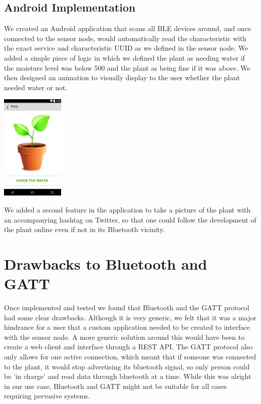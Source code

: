 \documentclass[10pt]{sensys-proc}
\begin{document}
\subsection{Android Implementation} 
We created an Android application that scans all BLE devices around, and once connected to the sensor node, would automatically read the characteristic with the exact service and characteristic UUID as we defined in the sensor node. We added a simple piece of logic in which we defined the plant as needing water if the moisture level was below 500 and the plant as being fine if it was above. We then designed an animation to visually display to the user whether the plant needed water or not. 

\includegraphics[height=2.0in]{./Images/figure3}

We added a second feature in the application to take a picture of the plant with an accompanying hashtag on Twitter, so that one could follow the development of the plant online even if not in its Bluetooth vicinity. 

\bigskip
\section{Drawbacks to Bluetooth and GATT}
Once implemented and tested we found that Bluetooth and the GATT protocol had some clear drawbacks. Although it is very generic, we felt that it was a major hindrance for a user that a custom application needed to be created to interface with the sensor node. A more generic solution around this would have been to create a web client and interface through a REST API. The GATT protocol also only allows for one active connection, which meant that if someone was connected to the plant, it would stop advertising its bluetooth signal, so only person could be 'in charge' and read data through bluetooth at a time. While this was alright in our use case, Bluetooth and GATT might not be suitable for all cases requiring pervasive systems. 

\bigskip
\end{document}
